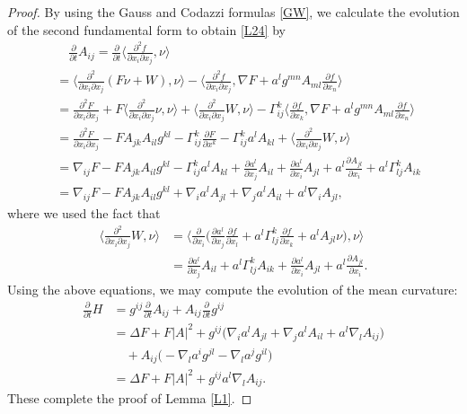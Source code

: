 \documentclass{amsart}
\theoremstyle{definition}
\numberwithin{equation}{section}
\begin{document}
\begin{proof}
By using the Gauss  and Codazzi formulas \eqref{GW}, we calculate the evolution of the second fundamental form to obtain \eqref{L24} by
\begin{align}
&\quad \frac{\partial }{\partial t} A_{ij}=\frac{\partial }{\partial
t}\langle \frac{\partial^2
f}{\partial x_i \partial x_j}, \nu\rangle\nonumber\\
&=\langle \frac{\partial^2 }{\partial x_i \partial
x_j}(F\nu+W), \nu\rangle-\langle \frac{\partial^2 f}{\partial
x_i \partial x_j}, \nabla F+a^l g^{mn}A_{ml}\frac{\partial f}{\partial x_n}\rangle \nonumber\\
&=\frac{\partial^2 F}{\partial x_i \partial x_j}+F\langle
\frac{\partial^2 }{\partial x_i \partial x_j}\nu, \nu\rangle+\langle
\frac{\partial^2 }{\partial x_i \partial x_j}W,
\nu\rangle-\Gamma_{ij}^k\langle \frac{\partial f}{\partial x_k},
\nabla F+a^l g^{mn}A_{ml}\frac{\partial f}{\partial
x_n}\rangle\nonumber\\
&=\frac{\partial^2 F}{\partial x_i \partial
x_j}-F A_{jk}A_{il}g^{kl}-\Gamma_{ij}^k\frac{\partial F}{\partial x^k}-\Gamma_{ij}^k
a^lA_{kl}+ \langle \frac{\partial^2
}{\partial x_i \partial x_j}W, \nu\rangle\nonumber \\
&=\nabla_{ij}F-F A_{jk}A_{il}g^{kl}-\Gamma_{ij}^k
a^lA_{kl}+\frac{\partial a^l}{\partial x_j}A_{il}+\frac{\partial
a^l}{\partial x_i}A_{jl}+a^l\frac{\partial
 A_{jl}}{\partial x_i}+ a^l\Gamma_{lj}^k A_{ik}\nonumber\\
&=\nabla_{ij}F-F A_{jk}A_{il}g^{kl}+\nabla_i
a^lA_{jl}+\nabla_j a^lA_{il}+a^l\nabla_i A_{jl}, \nonumber
\end{align}
 where we used the fact that
\begin{align}
\langle \frac{\partial^2 }{\partial x_i \partial x_j}W,
\nu\rangle
&=\langle\frac{\partial }{\partial x_i}\Big(\frac{\partial
a^l}{\partial x_j}\frac{\partial f}{\partial
x_l}+a^l\Gamma_{lj}^k\frac{\partial f}{\partial
x_k}+a^lA_{jl}\nu\Big),\nu \rangle\nonumber\\
&=\frac{\partial a^l}{\partial x_j}A_{il}+ a^l\Gamma_{lj}^k
A_{ik}+\frac{\partial a^l}{\partial x_i}A_{jl}+a^l\frac{\partial
 A_{jl}}{\partial x_i}\nonumber.
\end{align}
Using the above equations, we may compute the evolution of the mean
curvature:
\begin{align}
\frac{\partial }{\partial t}H&=g^{ij}\frac{\partial }{\partial t}A_{ij}+
A_{ij}\frac{\partial }{\partial t}g^{ij}\nonumber\\
&=\Delta F +F \vert A\vert ^2+ g^{ij}\big (\nabla_i a^lA_{jl}+\nabla_j a^lA_{il}+a^l\nabla_l A_{ij} \big)\nonumber\\
&\quad+A_{ij}\big(-\nabla_l a^i g^{jl}-\nabla_l a^jg^{il}\big)\nonumber\\
&=\Delta F +F \vert A\vert ^2+g^{ij}a^l\nabla_l
A_{ij}.\nonumber
\end{align}
These complete the proof of Lemma \ref{L1}.
\end{proof}
\end{document}
